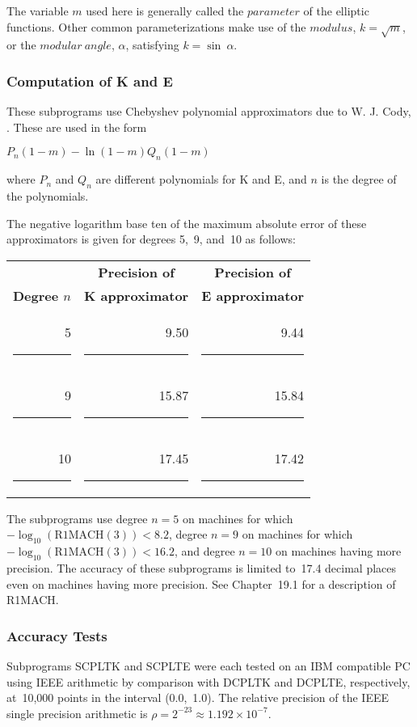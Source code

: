 \documentclass[twoside]{MATH77}
\begin{document}
The variable $m$ used here is generally called the $parameter$ of the elliptic
functions. Other common parameterizations make use of the $modulus$, $k =
\sqrt m$, or the $modular\ angle$, $\alpha $, satisfying $k = \sin \ \alpha .$

\subsubsection{Computation of K and E}

These subprograms use Chebyshev polynomial approximators due to W. J. Cody,
\cite{Cody:1965:CAC}. These are used in the form

\hspace{.4in}$P_n(1-m) - \ln (1-m) Q_n(1-m)$

where $P_n$ and $Q_n$ are different polynomials for K and E, and $n$ is the
degree of the polynomials.

The negative logarithm base ten of the maximum absolute error of these
approximators is given for degrees 5,~9, and~10 as follows:
\begin{center}
\begin{tabular}{rrr}
& \multicolumn{1}{c}{\bf Precision of} & \multicolumn{1}{c}{\bf Precision of}\\
\multicolumn{1}{c}{\bf Degree $n$} & \multicolumn{1}{c}{\bf K approximator} &
\multicolumn{1}{c}{\bf E approximator}\\
5 \rule{.25in}{0pt} & 9.50 \rule{.35in}{0pt} & 9.44 \rule{.35in}{0pt}\\
9 \rule{.25in}{0pt} & 15.87 \rule{.35in}{0pt} & 15.84 \rule{.35in}{0pt}\\
10 \rule{.25in}{0pt} &  17.45 \rule{.35in}{0pt} & 17.42 \rule{.35in}{0pt}
\end{tabular}
\end{center}
The subprograms use degree $n = 5$ on machines for which $%
-\log _{10}(\text{R1MACH}(3)) < 8.2$, degree $n = 9$ on machines for
which $-\log _{10}(\text{R1MACH}(3)) < 16.2$, and degree $n = 10$ on
machines having more precision. The accuracy of these subprograms is
limited to~17.4 decimal places even on machines having more precision.
See Chapter~19.1 for a description of R1MACH.

\subsubsection{Accuracy Tests}

Subprograms SCPLTK and SCPLTE were each tested on an IBM compatible
PC using IEEE arithmetic by
comparison with DCPLTK and DCPLTE, respectively, at~10,000 points in the
interval (0.0,~1.0). The relative precision of the IEEE single precision
arithmetic is $\rho = 2^{-23} \approx 1.192 \times 10^{-7}$.
\end{document}
